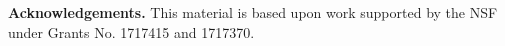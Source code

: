 \documentclass[conference]{IEEEtran}
\begin{document}






%






\smallskip \noindent \textbf{Acknowledgements.} 
This material is based upon work supported by the NSF under 
Grants No. 1717415 and 1717370.

\balance

\newpage


\end{document}

